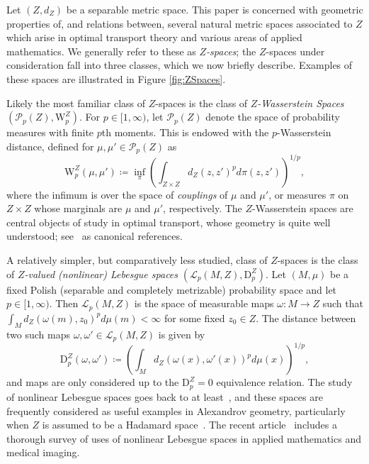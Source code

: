 \documentclass{article}
\theoremstyle{definition}
\newcommand{\WZ}{\mathcal{P}_p(Z)}
\newcommand{\wz}{\mathrm{W}_p^Z}
\newcommand{\Lp}{\mathcal{L}_p}
\newcommand{\dpz}{\mathrm{D}^Z_p}
\begin{document}
Let $(Z,d_Z)$ be a separable metric space. 
This paper is concerned with geometric properties of, and relations between, several natural  metric spaces associated to $Z$  which arise in optimal transport theory and various areas of applied mathematics. We generally refer to these as \emph{$Z$-spaces}; the $Z$-spaces under consideration fall into three classes, which we now briefly describe. Examples of these spaces are illustrated in Figure \ref{fig:ZSpaces}.

\smallskip

 Likely the most familiar class of $Z$-spaces is the class of \emph{$Z$-Wasserstein Spaces} $(\WZ, \wz)$. For $p \in [1,\infty)$, let $\WZ$ denote the space of probability measures with finite $p$th moments. This is  endowed with the \emph{$p$}-Wasserstein distance, defined for $\mu,\mu' \in \WZ$ as 
\begin{equation}\label{eqn:wasserstein_distance}
\wz(\mu,\mu') \coloneqq \inf_\pi \left( \int_{Z \times Z} d_Z(z,z')^p d\pi(z,z')\right)^{1/p},
\end{equation}
where the infimum is over the space of \emph{couplings} of $\mu$ and $\mu'$, or measures $\pi$ on $Z \times Z$ whose marginals are $\mu$ and $\mu'$, respectively. The $Z$-Wasserstein spaces are central objects of study in optimal transport, whose geometry is quite well understood; see~\cite{villani2008optimal,villani2021topics} as canonical references.

\smallskip 

 A relatively simpler, but comparatively less studied, class of $Z$-spaces is the class of \emph{$Z$-valued (nonlinear) Lebesgue spaces} $(\Lp(M,Z),\dpz)$. Let $(M,\mu)$ be a fixed Polish (separable and completely metrizable) probability space and let $p \in [1,\infty)$. Then $\Lp(M,Z)$ is the space of measurable maps $\omega:M \to Z$ such that $\int_M d_Z(\omega(m),z_0)^p d\mu(m) < \infty$ for some fixed $z_0 \in Z$. The distance between two such maps $\omega,\omega' \in \Lp(M,Z)$ is given by 
\begin{equation}\label{eqn:Lp_distance}
\dpz(\omega,\omega') \coloneqq \left(\int_M d_Z(\omega(x),\omega'(x))^p d\mu(x) \right)^{1/p},
\end{equation}
and maps are only considered up to the $\dpz=0$ equivalence relation. The study of nonlinear Lebesgue spaces goes back to at least~\cite{korevaar1993sobolev}, and these spaces are frequently considered as useful examples in Alexandrov geometry, particularly when $Z$ is assumed to be a Hadamard space~\cite{jost1994equilibrium,sturm2003probability,bacak2014convex}. The recent article~\cite{serieys2025nonlinear} includes a thorough survey of uses of nonlinear Lebesgue spaces in applied mathematics and medical imaging.
\end{document}
